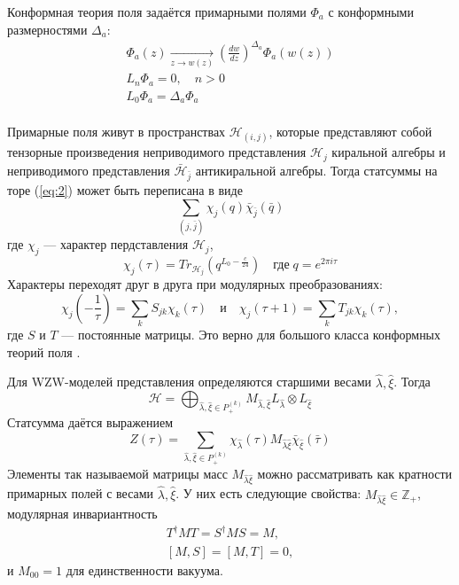 \documentclass[a4paper,12pt]{article}
\theoremstyle{definition} \newtheorem{Def}{Definition}
\begin{document}
Конформная теория поля задаётся примарными полями $\Phi_a$ с конформными размерностями $\Delta_a$:
\begin{equation}
  \label{eq:3}
  \begin{split}
    \Phi_{a}(z)\underset{z\to w(z)}{\longrightarrow} \left(\frac{dw}{dz}\right)^{\Delta_a}\Phi_{a}(w(z))\\
    L_n \Phi_a=0,\quad n>0\\
    L_0 \Phi_a=\Delta_a \Phi_a\\
  \end{split}
\end{equation}

Примарные поля живут в пространствах $\mathcal{H}_{(i,j)}$, которые представляют собой тензорные произведения неприводимого представления  $\mathcal{H}_j$ киральной алгебры и неприводимого представления $\bar{\mathcal{H}}_{\bar{j}}$ антикиральной алгебры. Тогда статсуммы на торе (\ref{eq:2}) может быть переписана в виде  
\begin{equation}
  \label{eq:4}
  \sum_{(j,\bar j)}\chi_j(q)\bar \chi_{\bar j}(\bar q)
\end{equation}
где $\chi_j$ --- характер пердставления $\mathcal{H}_j$,
\begin{equation}
  \label{eq:5}
  \chi_j(\tau)=Tr_{\mathcal{H}_j}(q^{L_0-\frac{c}{24}})\quad \mbox{где}\; q=e^{2\pi i \tau}
\end{equation}
Характеры переходят друг в друга при модулярных преобразованиях:
\begin{equation}
  \label{eq:107}
  \chi_j\left(-\frac{1}{\tau}\right)=\sum_k S_{jk}\chi_k(\tau)\quad \mbox{и}\quad \chi_j(\tau+1)=\sum_kT_{jk}\chi_k(\tau),
\end{equation}
где $S$ и $T$ --- постоянные матрицы. Это верно для большого класса конформных теорий поля \cite{gaberdiel2000icf}. 

Для WZW-моделей представления определяются старшими весами $\hat \lambda, \hat \xi$. Тогда
\begin{equation}
  \label{eq:6}
  \mathcal{H}=\bigoplus_{\hat \lambda,\hat \xi\in P^{(k)}_{+}}M_{\hat \lambda,\hat \xi} L_{\hat \lambda}\otimes L_{\hat \xi}
\end{equation}
Статсумма даётся выражением
\begin{equation}
  \label{eq:7}
  Z(\tau)=\sum_{\hat \lambda,\hat \xi\in P^{(k)}_{+}} \chi_{\hat \lambda}(\tau)M_{\hat \lambda\hat\xi}\bar \chi_{\hat \xi}(\bar \tau)
\end{equation}
Элементы так называемой матрицы масс $M_{\hat \lambda\hat\xi}$ можно рассматривать как кратности примарных полей с весами $\hat\lambda,\hat \xi$. У них есть следующие свойства: $M_{\hat \lambda\hat\xi}\in \mathbb{Z}_+$, модулярная инвариантность
\begin{equation}
  \label{eq:8}
  \begin{aligned}
    T^{\dagger}MT=S^{\dagger}MS=M,\\
    [M,S]=[M,T]=0,
  \end{aligned}
\end{equation}
и $M_{00}=1$ для единственности вакуума.
\end{document}
